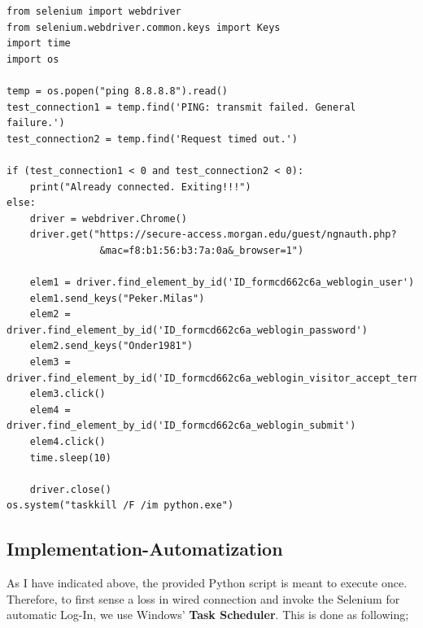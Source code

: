 \begin{verbatim}
from selenium import webdriver
from selenium.webdriver.common.keys import Keys
import time
import os

temp = os.popen("ping 8.8.8.8").read()
test_connection1 = temp.find('PING: transmit failed. General failure.')
test_connection2 = temp.find('Request timed out.')

if (test_connection1 < 0 and test_connection2 < 0):
    print("Already connected. Exiting!!!")
else:
    driver = webdriver.Chrome()
    driver.get("https://secure-access.morgan.edu/guest/ngnauth.php?
                &mac=f8:b1:56:b3:7a:0a&_browser=1")
    
    elem1 = driver.find_element_by_id('ID_formcd662c6a_weblogin_user')
    elem1.send_keys("Peker.Milas")
    elem2 = driver.find_element_by_id('ID_formcd662c6a_weblogin_password')
    elem2.send_keys("Onder1981")
    elem3 = driver.find_element_by_id('ID_formcd662c6a_weblogin_visitor_accept_terms')
    elem3.click()
    elem4 = driver.find_element_by_id('ID_formcd662c6a_weblogin_submit')
    elem4.click()
    time.sleep(10)

    driver.close()
os.system("taskkill /F /im python.exe")
\end{verbatim}

\subsection{Implementation-Automatization}
As I have indicated above, the provided Python script is meant to execute once.
Therefore, to first sense a loss in wired connection and invoke the Selenium
for automatic Log-In, we use Windows' \textbf{Task Scheduler}. This is done as
following;

